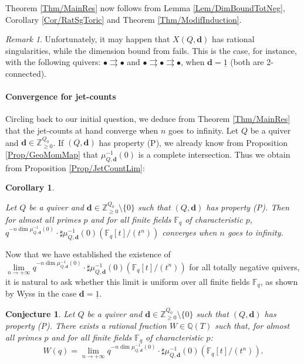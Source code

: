 \documentclass[11pt,english]{article}
\numberwithin{equation}{section}
\numberwithin{figure}{section}
\theoremstyle{definition}
\theoremstyle{plain}
\newtheorem{cj}[df]{Conjecture}
\newtheorem{cor}[df]{Corollary}
\theoremstyle{remark}
\newtheorem{rmk}[df]{Remark}
\newcommand\dd{\mathbf{d}}
\newcommand\ZZ{\mathbb{Z}}
\begin{document}
Theorem \ref{Thm/MainRes} now follows from Lemma \ref{Lem/DimBoundTotNeg},
Corollary \ref{Cor/RatSgToric} and Theorem \ref{Thm/ModifInduction}.

\begin{rmk} 

Unfortunately, it may happen that $X(Q,\dd)$ has rational singularities,
while the dimension bound from \cite[Lem. 2.16.]{Bud21} fails. This
is the case, for instance, with the following quivers: $\bullet\rightrightarrows\bullet$
and $\bullet\rightrightarrows\bullet\rightrightarrows\bullet$, when
$\dd=\underline{1}$ (both are 2-connected).

\end{rmk}

\paragraph*{Convergence for jet-counts}

Circling back to our initial question, we deduce from Theorem \ref{Thm/MainRes}
that the jet-counts at hand converge when $n$ goes to infinity. Let
$Q$ be a quiver and $\dd\in\ZZ_{\geq0}^{Q_{0}}$. If $(Q,\dd)$ has
property (P), we already know from Proposition \ref{Prop/GeoMomMap}
that $\mu_{Q,\dd}^{-1}(0)$ is a complete intersection. Thus we obtain
from Proposition \ref{Prop/JetCountLim}:

\begin{cor} \label{Cor/TotNegJetLim}

Let $Q$ be a quiver and $\dd\in\ZZ_{\geq0}^{Q_{0}}\setminus\{0\}$
such that $(Q,\dd)$ has property (P). Then for almost all primes
$p$ and for all finite fields $\mathbb{F}_{q}$ of characteristic
$p$, $q^{-n\dim\mu_{Q,\dd}^{-1}(0)}\cdot\sharp\mu_{Q,\dd}^{-1}(0)(\mathbb{F}_{q}[t]/(t^{n}))$
converges when $n$ goes to infinity.

\end{cor}

Now that we have established the existence of $\underset{n\rightarrow+\infty}{\lim}q^{-n\dim\mu_{Q,\dd}^{-1}(0)}\cdot\sharp\mu_{Q,\dd}^{-1}(0)(\mathbb{F}_{q}[t]/(t^{n}))$
for all totally negative quivers, it is natural to ask whether this
limit is uniform over all finite fields $\mathbb{F}_{q}$, as shown
by Wyss in the case $\dd=\underline{1}$.

\begin{cj}

Let $Q$ be a quiver and $\dd\in\mathbb{Z}_{\geq0}^{Q_{0}}\setminus\{0\}$
such that $(Q,\dd)$ has property (P). There exists a rational fraction
$W\in\mathbb{Q}(T)$ such that, for almost all primes $p$ and for
all finite fields $\mathbb{F}_{q}$ of characteristic $p$:\[
W(q)=\underset{n\rightarrow+\infty}{\lim}q^{-n\dim \mu_{Q,\dd}^{-1}(0)}\cdot\sharp\mu_{Q,\dd}^{-1}(0)(\mathbb{F}_{q}[t]/(t^{n})).
\]\end{cj}
\end{document}
